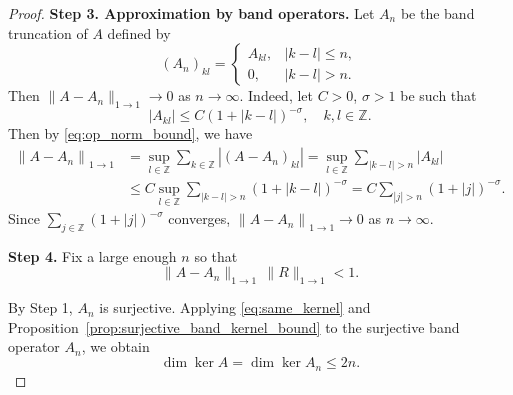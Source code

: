 \documentclass[10pt,a4paper]{amsart}
\def\Z{{\mathbb Z}}
\newcommand{\norm}[1]{\left\lVert #1 \right\rVert}
\begin{document}
\begin{proof}
\textbf{Step 3. Approximation by band operators.}
Let $A_n$ be the band truncation of $A$  defined by
$$
(A_n)_{kl}=
\begin{cases}
A_{kl}, & |k-l|\leq n,\\
0, & |k-l|>n .
\end{cases}
$$
Then 
$
\|A-A_n\|_{1\to1} \to 0
$
as $n \to \infty$. Indeed, 
   let $C>0$, $\sigma>1$ be such that 
   \begin{equation}
       |A_{kl}|\le C(1+|k-l|)^{-\sigma},
\quad k,l\in\mathbb Z.
   \end{equation}
   Then by \eqref{eq:op_norm_bound}, we have
   \begin{align}
       \norm{A-A_n}_{1 \to 1} & =\sup\limits_{l\in\Z}\sum\limits_{k\in\Z}|(A-A_n)_{kl}| = \sup\limits_{l\in\Z}\sum\limits_{|k-l|>n}|A_{kl}| \\
       & \leq  C \sup\limits_{l\in\Z}\sum\limits_{|k-l|>n} (1+|k-l|)^{-\sigma} 
       = C \sum\limits_{|j|>n} (1+|j|)^{-\sigma}.
   \end{align}
   Since $\sum\limits_{j\in\Z} (1+|j|)^{-\sigma}$ converges, $\norm{A-A_n}_{1\to 1}\to 0$ as $n\to \infty$.

\textbf{Step 4.}
Fix a large enough $n$ so that
$$
\|A-A_n\|_{1\to1}\,\|R\|_{1\to1}<1 .
$$

By Step 1, $A_n$ is surjective. 
Applying \eqref{eq:same_kernel} and Proposition~\ref{prop:surjective_band_kernel_bound} to the surjective band operator $A_n$, we obtain
\begin{equation}
    \dim\ker A= \dim\ker A_n \leq 2n.
\end{equation}
\end{proof}
\end{document}
